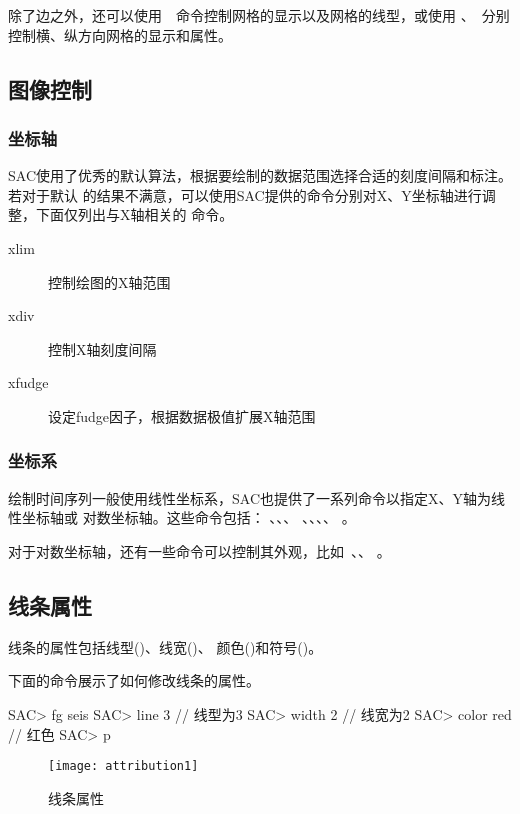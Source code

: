 除了边之外，还可以使用~~命令控制网格的显示以及网格的线型，或使用
、~分别控制横、纵方向网格的显示和属性。

\subsection{图像控制}
\subsubsection{坐标轴}
SAC使用了优秀的默认算法，根据要绘制的数据范围选择合适的刻度间隔和标注。若对于默认
的结果不满意，可以使用SAC提供的命令分别对X、Y坐标轴进行调整，下面仅列出与X轴相关的
命令。
\begin{description}
\item [xlim] 控制绘图的X轴范围
\item [xdiv] 控制X轴刻度间隔
\item [xfudge] 设定fudge因子，根据数据极值扩展X轴范围
\end{description}

\subsubsection{坐标系}
绘制时间序列一般使用线性坐标系，SAC也提供了一系列命令以指定X、Y轴为线性坐标轴或
对数坐标轴。这些命令包括： 、、、
、、、、
。

对于对数坐标轴，还有一些命令可以控制其外观，比如~、、
。

\subsection{线条属性}
\label{subsec:line-attribution}

线条的属性包括线型()、线宽()、
颜色()和符号()。

下面的命令展示了如何修改线条的属性。
\begin{SACCode}
SAC> fg seis
SAC> line 3         // 线型为3
SAC> width 2        // 线宽为2
SAC> color red      // 红色
SAC> p
\end{SACCode}

\begin{figure}[H]
\centering
\texttt{[image: attribution1]}
\caption{线条属性}
\end{figure}

